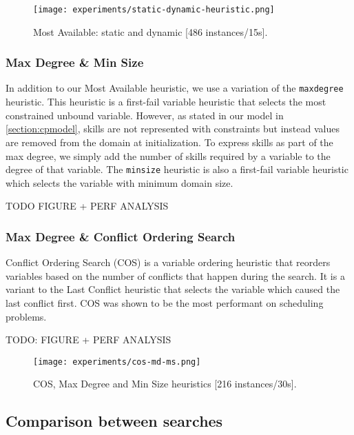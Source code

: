 \documentclass[../../thesis.tex]{subfiles}
\begin{document}


\begin{figure}
  \centering
  \texttt{[image: experiments/static-dynamic-heuristic.png]}
  \caption{Most Available: static and dynamic [486 instances/15s].}
  \label{experiments:heuristic2}
\end{figure}


\subsubsection{Max Degree \& Min Size}

In addition to our Most Available heuristic, we use a variation of the \texttt{maxdegree} heuristic. 
This heuristic is a first-fail variable heuristic that selects the most constrained unbound variable. However,
as stated in our model in \autoref{section:cpmodel}, skills are not represented with constraints but instead values 
are removed from the domain at initialization. To express skills as part of the max degree, we simply add the number of 
skills required by a variable to the degree of that variable. The \texttt{minsize} heuristic is also a first-fail variable heuristic which 
selects the variable with minimum domain size.

TODO FIGURE + PERF ANALYSIS 


\subsubsection{Max Degree \& Conflict Ordering Search}

Conflict Ordering Search (COS) \cite{Gay:COS} is a variable ordering heuristic that 
reorders variables based on the number of conflicts that happen during the search.
It is a variant to the Last Conflict heuristic that selects the variable which caused the last conflict first.
COS was shown to be the most performant on scheduling problems.


TODO: FIGURE + PERF ANALYSIS

\begin{figure}
  \centering
  \texttt{[image: experiments/cos-md-ms.png]}
  \caption{COS, Max Degree and Min Size heuristics [216 instances/30s].}
  \label{experiments:heuristics:3}
\end{figure}


\subsection{Comparison between searches}
\end{document}
